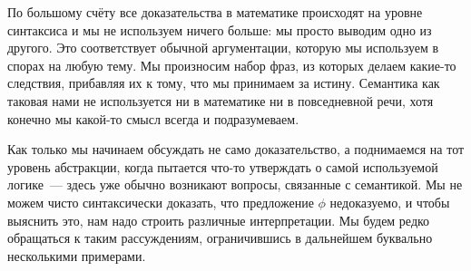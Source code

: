 По большому счёту все доказательства в математике происходят на уровне синтаксиса и мы не используем ничего больше: мы просто выводим одно из другого. Это соответствует обычной аргументации, которую мы используем в спорах на любую тему. Мы произносим набор фраз, из которых делаем какие-то следствия, прибавляя их к тому, что мы принимаем за истину. Семантика как таковая нами не используется ни в математике ни в повседневной речи, хотя конечно мы какой-то смысл всегда и подразумеваем.

Как только мы начинаем обсуждать не само доказательство, а поднимаемся на тот уровень абстракции, когда пытается что-то утверждать о самой используемой логике~— здесь уже обычно возникают вопросы, связанные с семантикой. Мы не можем чисто синтаксически доказать, что предложение $\phi$ недоказуемо, и чтобы выяснить это, нам надо строить различные интерпретации. Мы будем редко обращаться к таким рассуждениям, ограничившись в дальнейшем буквально несколькими примерами.
